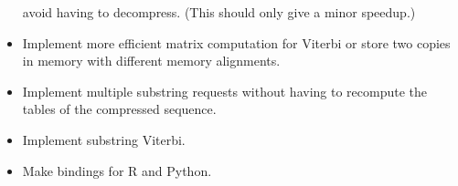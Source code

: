 \begin{itemize}
  avoid having to decompress. (This should only give a minor speedup.) 
\item Implement more efficient matrix computation for Viterbi or store two
  copies in memory with different memory alignments. 
\item Implement multiple substring requests without having to recompute the
  tables of the compressed sequence. 
\item Implement substring Viterbi. 
\item Make bindings for R and Python. 
\end{itemize}


